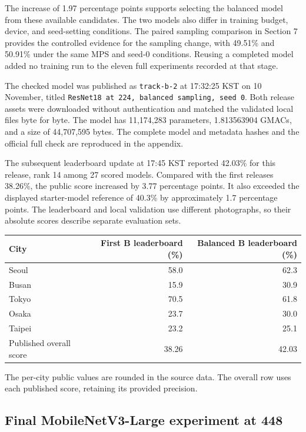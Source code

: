 \documentclass[11pt]{article}
\begin{document}
The increase of 1.97 percentage points supports selecting the balanced
model from these available candidates. The two models also differ in
training budget, device, and seed-setting conditions. The paired sampling
comparison in Section 7 provides the controlled evidence for the sampling
change, with 49.51\% and 50.91\% under the same MPS and seed-0 conditions.
Reusing a completed model added no training run to the eleven full
experiments recorded at that stage.

The checked model was published as \texttt{track-b-2} at 17:32:25 KST
on 10 November, titled \texttt{ResNet18 at 224, balanced sampling, seed 0}.
Both release assets were downloaded without authentication and matched
the validated local files byte for byte. The model has 11,174,283 parameters,
1.813563904 GMACs, and a size of 44,707,595 bytes. The complete model and
metadata hashes and the official full check are reproduced in the appendix.

The subsequent leaderboard update at 17:45 KST reported 42.03\% for this
release, rank 14 among 27 scored models. Compared with the first release\textquotesingle{}s
38.26\%, the public score increased by 3.77 percentage points. It also
exceeded the displayed starter-model reference of 40.3\% by approximately
1.7 percentage points. The leaderboard and local validation use different
photographs, so their absolute scores describe separate evaluation sets.

\begin{center}\small
\begin{tabular}{lrr}
\toprule
City & First B leaderboard (\%) & Balanced B leaderboard (\%) \\
\midrule
Seoul & 58.0 & 62.3 \\
Busan & 15.9 & 30.9 \\
Tokyo & 70.5 & 61.8 \\
Osaka & 23.7 & 30.0 \\
Taipei & 23.2 & 25.1 \\
\midrule
Published overall score & 38.26 & 42.03 \\
\bottomrule
\end{tabular}
\end{center}

The per-city public values are rounded in the source data. The overall
row uses each published score, retaining its provided precision.

\subsection{Final MobileNetV3-Large experiment at 448}
\end{document}
